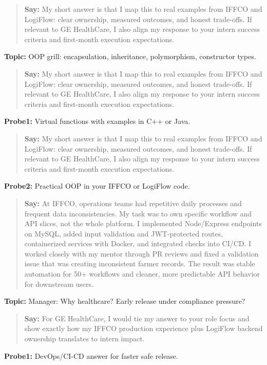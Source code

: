 \documentclass[9pt,a4paper]{article}
\begin{document}
\begin{quote}\small\textbf{Say:} My short answer is that I map this to real examples from IFFCO and LogiFlow: clear ownership, measured outcomes, and honest trade-offs. If relevant to GE HealthCare, I also align my response to your intern success criteria and first-month execution expectations.\end{quote}
\vspace{2mm}
\textbf{Topic:} OOP grill: encapsulation, inheritance, polymorphism, constructor types.

\begin{quote}\small\textbf{Say:} My short answer is that I map this to real examples from IFFCO and LogiFlow: clear ownership, measured outcomes, and honest trade-offs. If relevant to GE HealthCare, I also align my response to your intern success criteria and first-month execution expectations.\end{quote}
\vspace{2mm}
\textbf{Probe1:} Virtual functions with examples in C++ or Java.

\begin{quote}\small\textbf{Say:} My short answer is that I map this to real examples from IFFCO and LogiFlow: clear ownership, measured outcomes, and honest trade-offs. If relevant to GE HealthCare, I also align my response to your intern success criteria and first-month execution expectations.\end{quote}
\vspace{2mm}
\textbf{Probe2:} Practical OOP in your IFFCO or LogiFlow code.

\begin{quote}\small\textbf{Say:} At IFFCO, operations teams had repetitive daily processes and frequent data inconsistencies. My task was to own specific workflow and API slices, not the whole platform. I implemented Node/Express endpoints on MySQL, added input validation and JWT-protected routes, containerized services with Docker, and integrated checks into CI/CD. I worked closely with my mentor through PR reviews and fixed a validation issue that was creating inconsistent farmer records. The result was stable automation for 50+ workflows and cleaner, more predictable API behavior for downstream users.\end{quote}
\vspace{2mm}
\textbf{Topic:} Manager: Why healthcare? Early release under compliance pressure?

\begin{quote}\small\textbf{Say:} For GE HealthCare, I would tie my answer to your role focus and show exactly how my IFFCO production experience plus LogiFlow backend ownership translates to intern impact.\end{quote}
\vspace{2mm}
\textbf{Probe1:} DevOps/CI-CD answer for faster safe release.
\end{document}
